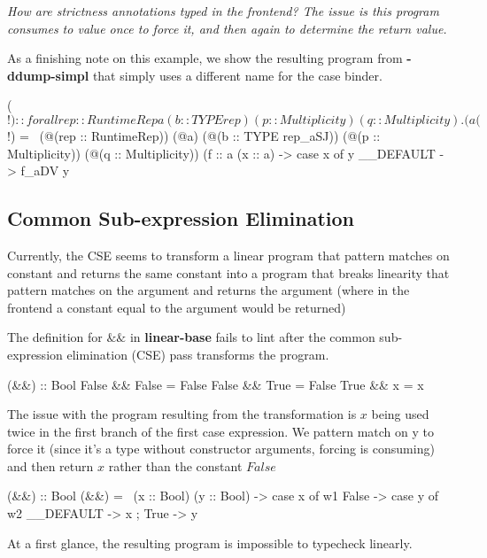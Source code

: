 \documentclass[a4paper, draft]{article}
\begin{document}
\begin{code}
\emph{How are strictness annotations typed in the frontend? The issue is this program
consumes to value once to force it, and then again to determine the return
value.}


As a finishing note on this example, we show the resulting program from
\textbf{-ddump-simpl} that simply uses a different name for the case binder.
\begin{code}
($!)
  :: forall {rep :: RuntimeRep} a (b :: TYPE rep)
            (p :: Multiplicity) (q :: Multiplicity).
     (a %
($!)
  = \ (@(rep :: RuntimeRep))
      (@a)
      (@(b :: TYPE rep_aSJ))
      (@(p :: Multiplicity))
      (@(q :: Multiplicity))
      (f :: a %
      (x :: a) ->
      case x of y { __DEFAULT -> f_aDV y }
\end{code}

\subsection{Common Sub-expression Elimination}

Currently, the CSE seems to transform a linear program that pattern matches on
constant and returns the same constant into a program that breaks linearity that
pattern matches on the argument and returns the argument (where in the frontend
a constant equal to the argument would be returned)

The definition for $\&\&$ in \textbf{linear-base} fails to lint after the common
sub-expression elimination (CSE) pass transforms the program.
\begin{code}
(&&) :: Bool %
False && False = False
False && True = False
True && x = x
\end{code}
The issue with the program resulting from the transformation is $x$ being used
twice in the first branch of the first case expression. We pattern match on y to
force it (since it's a type without constructor arguments, forcing is consuming)
and then return $x$ rather than the constant $False$
\begin{code}
(&&) :: Bool %
(&&) = \ (x :: Bool) (y :: Bool) ->
  case x of w1 {
    False -> case y of w2 { __DEFAULT -> x };
    True -> y
  }
\end{code}
At a first glance, the resulting program is impossible to typecheck linearly.


\end{code}
\end{document}
